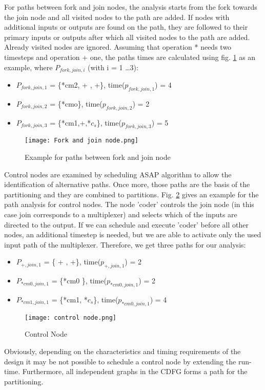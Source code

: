 \documentclass[conference]{IEEEtran}
\begin{document}
For paths between fork and join nodes, the analysis starts from the fork towards the join node and all visited nodes to the path are added. If nodes with additional inputs or outputs are found on the path, they are followed to their primary inputs or outputs after which all visited nodes to the path are added. Already visited nodes are ignored. Assuming that operation * needs two timesteps and operation + one, the paths times are calculated using fig. \ref{fig:fork and join} as an example, where $P_{fork,join,i}$ (with i = 1 \ldots 3): 
\begin{itemize}
    \item $P_{fork,join,1}$ = \{*cm2, + , +\}, time($p_{fork,join,1}$) = 4
    \item $P_{fork,join,2}$ = \{*cmo\}, time($p_{fork,join,2}$) = 2 
    \item $P_{fork,join,3}$ = \{*cm1,+,*$c_s$\}, time($p_{fork,join,3}$) = 5
\end{itemize}

\begin{figure}[h!]
    \centering
    \texttt{[image: Fork and join node.png]}
    \caption{Example for paths between fork and join node \cite{10.1007/978-0-387-39362-9_24}}
    \label{fig:fork and join}
\end{figure}

Control nodes are examined by scheduling ASAP algorithm to allow the identification of alternative paths. Once more, those paths are the basis of the partitioning and they are combined to partitions. Fig. \ref{fig:control node} gives an example for the path analysis for control nodes. The node 'coder' controls the join node (in this case join corresponds to a multiplexer) and selects which of the inputs are directed to the output. If we can schedule and execute 'coder' before all other nodes, an additional timestep is needed, but we are able to activate only the used input path of the multiplexer. Therefore, we get three paths for our analysis:  

\begin{itemize}
    \item $P_{+,join,1}$ = \{ + , +\}, time($p_{+,join,1}$) = 2
    \item $P_{*cm0,join,1}$ = \{*cm0 \}, time($p_{*cm0,join,1}$) = 2
    \item $P_{*cm1,join,1}$ = \{*cm1, *$c_s$\}, time($p_{*cm0,join,1}$) = 4
\end{itemize}

\begin{figure}[h!]
    \centering
    \texttt{[image: control node.png]}
    \caption{Control Node \cite{10.1007/978-0-387-39362-9_24}}
    \label{fig:control node}
\end{figure}
Obviously, depending on the characteristics and timing requirements of the design it may be not possible to schedule a control node by extending the run-time. Furthermore, all independent graphs in the CDFG forms a path for the partitioning.
\end{document}
